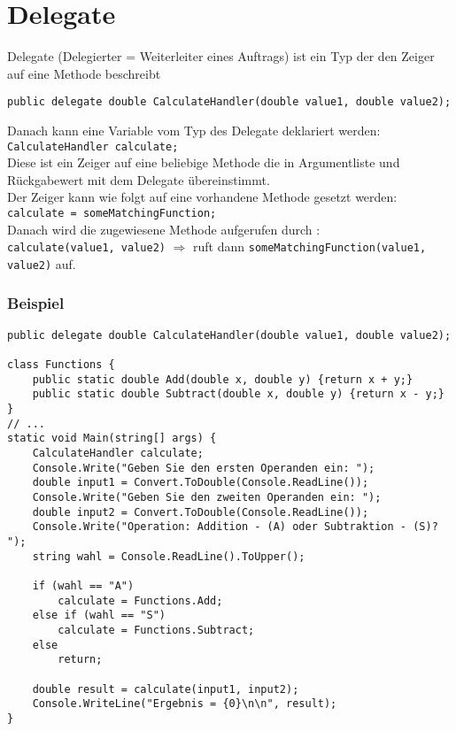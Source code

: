 \section{Delegate}
Delegate (Delegierter = Weiterleiter eines Auftrags) ist ein Typ der den Zeiger auf eine Methode beschreibt
\begin{lstlisting}[language={[Sharp]C}]
public delegate double CalculateHandler(double value1, double value2); 
\end{lstlisting}
Danach kann eine Variable vom Typ des Delegate deklariert werden:\\
\lstinline$CalculateHandler calculate;$\\
Diese ist ein Zeiger auf eine beliebige Methode die in Argumentliste und Rückgabewert mit dem Delegate übereinstimmt.\\
Der Zeiger kann wie folgt auf eine vorhandene Methode gesetzt werden:\\
\lstinline$calculate = someMatchingFunction;$\\
Danach wird die zugewiesene Methode aufgerufen durch :\\
\lstinline$calculate(value1, value2)$ $\Rightarrow$ ruft dann \lstinline$someMatchingFunction(value1, value2)$ auf.

\subsubsection*{Beispiel}

\begin{lstlisting}[language={[Sharp]C}]
public delegate double CalculateHandler(double value1, double value2);

class Functions {
	public static double Add(double x, double y) {return x + y;}
	public static double Subtract(double x, double y) {return x - y;}
}
// ...
static void Main(string[] args) {
	CalculateHandler calculate;
	Console.Write("Geben Sie den ersten Operanden ein: ");
	double input1 = Convert.ToDouble(Console.ReadLine());
	Console.Write("Geben Sie den zweiten Operanden ein: ");
	double input2 = Convert.ToDouble(Console.ReadLine());  
	Console.Write("Operation: Addition - (A) oder Subtraktion - (S)? ");
	string wahl = Console.ReadLine().ToUpper();

	if (wahl == "A")
		calculate = Functions.Add;
	else if (wahl == "S") 
		calculate = Functions.Subtract;
	else 
		return;

	double result = calculate(input1, input2);
	Console.WriteLine("Ergebnis = {0}\n\n", result);
}
\end{lstlisting}

